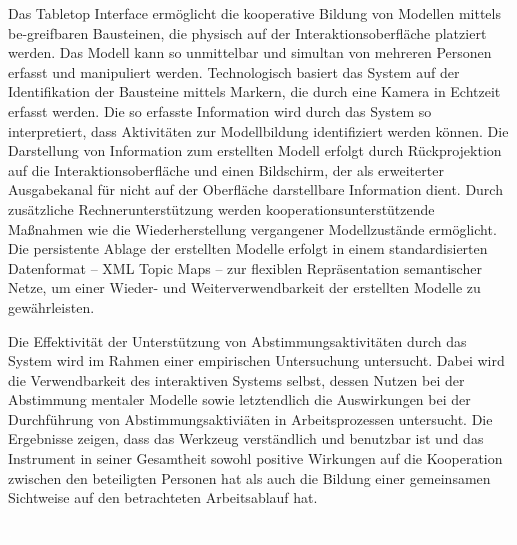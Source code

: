 Das Tabletop Interface ermöglicht die kooperative Bildung von Modellen mittels be-greifbaren Bausteinen, die physisch auf der Interaktionsoberfläche platziert werden. Das Modell kann so unmittelbar und simultan von mehreren Personen erfasst und manipuliert werden. Technologisch basiert das System auf der Identifikation der Bausteine mittels Markern, die durch eine Kamera in Echtzeit erfasst werden. Die so erfasste Information wird durch das System so interpretiert, dass Aktivitäten zur Modellbildung identifiziert werden können. Die Darstellung von Information zum erstellten Modell erfolgt durch Rückprojektion auf die Interaktionsoberfläche und einen Bildschirm, der als erweiterter Ausgabekanal für nicht auf der Oberfläche darstellbare Information dient. Durch zusätzliche Rechnerunterstützung werden kooperationsunterstützende Maßnahmen wie die Wiederherstellung vergangener Modellzustände ermöglicht. Die persistente Ablage der erstellten Modelle erfolgt in einem standardisierten Datenformat -- XML Topic Maps -- zur flexiblen Repräsentation semantischer Netze, um einer Wieder- und Weiterverwendbarkeit der erstellten Modelle zu gewährleisten.

Die Effektivität der Unterstützung von Abstimmungsaktivitäten durch das System wird im Rahmen einer empirischen Untersuchung untersucht. Dabei wird die Verwendbarkeit des interaktiven Systems selbst, dessen Nutzen bei der Abstimmung mentaler Modelle sowie letztendlich die Auswirkungen bei der Durchführung von Abstimmungsaktiviäten in Arbeitsprozessen untersucht. Die Ergebnisse zeigen, dass das Werkzeug verständlich und benutzbar ist und das Instrument in seiner Gesamtheit sowohl positive Wirkungen auf die Kooperation zwischen den beteiligten Personen hat als auch die Bildung einer gemeinsamen Sichtweise auf den betrachteten Arbeitsablauf hat.

\newpage
\textcolor{white}
.
\textcolor{black}
\newpage
 
\cleardoublepage

